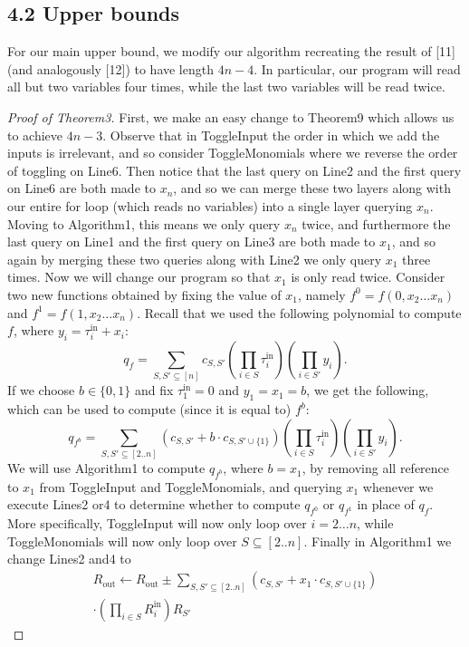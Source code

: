 \subsection*{4.2 Upper bounds}
For our main upper bound, we modify our algorithm recreating the result of [11] (and analogously [12]) to have length $4n-4$. In particular, our program will read all but two variables four times, while the last two variables will be read twice.
\begin{proof}[Proof of Theorem3]
First, we make an easy change to Theorem9 which allows us to achieve $4n-3$. Observe that in ToggleInput the order in which we add the inputs is irrelevant, and so consider ToggleMonomials where we reverse the order of toggling on Line6. Then notice that the last query on Line2 and the first query on Line6 are both made to $x_n$, and so we can merge these two layers along with our entire for loop (which reads no variables) into a single layer querying $x_n$. Moving to Algorithm1, this means we only query $x_n$ twice, and furthermore the last query on Line1 and the first query on Line3 are both made to $x_1$, and so again by merging these two queries along with Line2 we only query $x_1$ three times.
Now we will change our program so that $x_1$ is only read twice. Consider two new functions obtained by fixing the value of $x_1$, namely $f^0=f(0,x_2\ldots x_n)$ and $f^1=f(1,x_2\ldots x_n)$. Recall that we used the following polynomial to compute $f$, where $y_i=\tau_i^{\mathrm{in}}+x_i$:
\[q_f=\sum_{S,S'\subseteq[n]}c_{S,S'}\left(\prod_{i\in S}\tau_i^{\mathrm{in}}\right)\left(\prod_{i\in S'}y_i\right).\]
If we choose $b\in\{0,1\}$ and fix $\tau_1^{\mathrm{in}}=0$ and $y_1=x_1=b$, we get the following, which can be used to compute (since it is equal to) $f^b$:
\[q_{f^b}=\sum_{S,S'\subseteq[2..n]}(c_{S,S'}+b\cdot c_{S,S'\cup\{1\}})\left(\prod_{i\in S}\tau_i^{\mathrm{in}}\right)\left(\prod_{i\in S'}y_i\right).\]
We will use Algorithm1 to compute $q_{f^b}$, where $b=x_1$, by removing all reference to $x_1$ from ToggleInput and ToggleMonomials, and querying $x_1$ whenever we execute Lines2 or4 to determine whether to compute $q_{f^0}$ or $q_{f^1}$ in place of $q_f$. More specifically, ToggleInput will now only loop over $i=2\ldots n$, while ToggleMonomials will now only loop over $S\subseteq[2..n]$. Finally in Algorithm1 we change Lines2 and4 to
\begin{multline*}
R_{\mathrm{out}}\leftarrow R_{\mathrm{out}}\pm\sum_{S,S'\subseteq[2..n]}(c_{S,S'}+x_1\cdot c_{S,S'\cup\{1\}})\\
\cdot\left(\prod_{i\in S}R_i^{\mathrm{in}}\right)R_{S'}

\end{multline*}
\end{proof}
